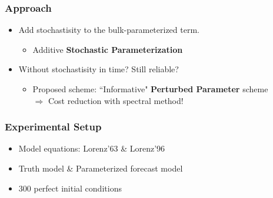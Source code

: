 \documentclass[graphics]{beamer}
\begin{document}
\begin{frame}
   \frametitle{Approach}
      \begin{itemize}
         \item Add stochastisity to the bulk-parameterized term.  %
		\begin{itemize}
		   \item Additive {\bf Stochastic Parameterization } \vspace{30pt}
		\end{itemize}
         \item Without stochastisity in time? Still reliable?
		\begin{itemize}
		   \item Proposed scheme: ``Informative" {\bf Perturbed Parameter} scheme  \\
		   \vspace{12pt}
		   $\Longrightarrow$ Cost reduction with spectral method!
		\end{itemize}
      \end{itemize}
\end{frame}

\begin{frame}
   \frametitle{Experimental Setup}
	\begin{itemize}
	   \item Model equations: Lorenz'63 \& Lorenz'96
		\vspace{12pt}
	   \item Truth model \& Parameterized forecast model
		\vspace{12pt}
	   \item 300 perfect initial conditions 
	\end{itemize}
\end{frame}
\end{document}
